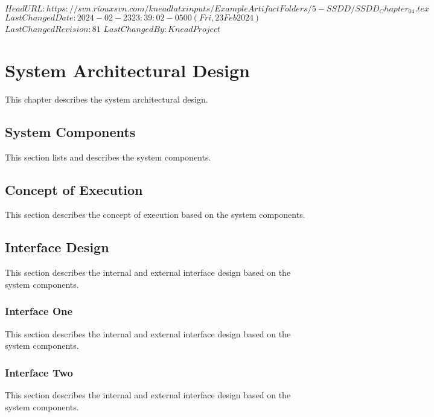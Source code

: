 \svnidlong
{$HeadURL: https://svn.riouxsvn.com/kneadlatxinputs/ExampleArtifactFolders/5-SSDD/SSDD_Chapter_04.tex $}
{$LastChangedDate: 2024-02-23 23:39:02 -0500 (Fri, 23 Feb 2024) $}
{$LastChangedRevision: 81 $}
{$LastChangedBy: KneadProject $}


\chapter{System Architectural Design}
\label{loc:SystemArchitecturalDesign}


This chapter describes the system architectural design.

\section{System Components}
\label{loc:SystemComponents}


This section lists and describes the system components.


\section{Concept of Execution}
\label{loc:ConceptOfEExecution}


This section describes the concept of execution based on the system components.


\section{Interface Design}
\label{loc:InterfaceDesign}


This section describes the internal and external interface design based on the system components.


\subsection{Interface One}
\label{loc:InterfaceOne}


This section describes the internal and external interface design based on the system components.

\subsection{Interface Two}
\label{loc:InterfaceTwo}
%

This section describes the internal and external interface design based on the system components.

